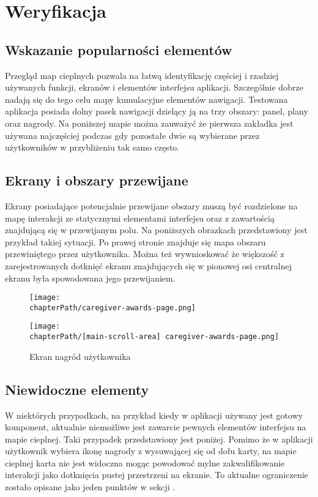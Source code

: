 \section{Weryfikacja}

\subsection{Wskazanie popularności elementów}
Przegląd map cieplnych pozwala na łatwą identyfikację częściej i rzadziej używanych funkcji, ekranów i elementów interfejsu aplikacji. Szczególnie dobrze nadają się do tego celu mapy kumulacyjne elementów nawigacji. Testowana aplikacja posiada dolny pasek nawigacji dzielący ją na trzy obszary: panel, plany oraz nagrody. Na poniższej mapie można zauważyć że pierwsza zakładka jest używana najczęściej podczas gdy pozostałe dwie są wybierane przez użytkowników w przybliżeniu tak samo często.

\bigskip
{}

\subsection{Ekrany i obszary przewijane}
Ekrany posiadające potencjalnie przewijane obszary muszą być rozdzielone na mapę interakcji ze statycznymi elementami interfejsu oraz z zawartością znajdującą się w przewijanym polu. Na poniższych obrazkach przedstawiony jest przykład takiej sytuacji. Po prawej stronie znajduje się mapa obszaru przewiniętego przez użytkownika. Można też wywnioskować że większość z zarejestrowanych dotknięć ekranu znajdujących się w pionowej osi centralnej ekranu była spowodowana jego przewijaniem. 

\bigskip
\begin{figure}[H]
\centering
\begin{minipage}{.35\textwidth}
	\centering
	\texttt{[image: \\chapterPath/caregiver-awards-page.png]}
\end{minipage}
\begin{minipage}{.3\textwidth}
	\centering
	\texttt{[image: \\chapterPath/[main-scroll-area] caregiver-awards-page.png]}
\end{minipage}
\bigskip
\caption{Ekran nagród użytkownika}
\label{fig:rs_panel_parts}
\end{figure}

\subsection{Niewidoczne elementy}
W niektórych przypadkach, na przykład kiedy w aplikacji używany jest gotowy komponent, aktualnie niemożliwe jest zawarcie pewnych elementów interfejsu na mapie cieplnej. Taki przypadek przedstawiony jest poniżej. Pomimo że w aplikacji użytkownik wybiera ikonę nagrody z wysuwającej się od dołu karty, na mapie cieplnej karta nie jest widoczna mogąc powodować mylne zakwalifikowanie interakcji jako dotknięcia pustej przestrzeni na ekranie. To aktualne ograniczenie zostało opisane jako jeden punktów w sekcji .

